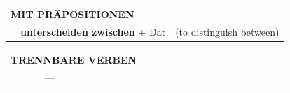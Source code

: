 \documentclass[10pt,a4paper]{revtex4-2}
\begin{document}
\begin{verbbox}
\vspace{10pt}

\begin{tabular}{lll}
\multicolumn{3}{l}{\textbf{MIT PRÄPOSITIONEN}}\\
& \textbf{unterscheiden zwischen} + Dat & (to distinguish between)\\
\end{tabular}
\hfill
\begin{tabular}{lll}
\multicolumn{3}{l}{\textbf{TRENNBARE VERBEN}}\\
& ---\\
\end{tabular}

\vspace{-5pt}
\end{verbbox}

\end{document}
